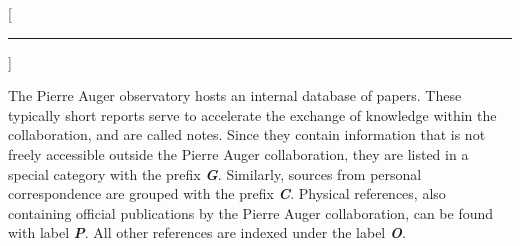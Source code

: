
[\hrule\vspace{-0.5cm}]
\printbibheading

The Pierre Auger observatory hosts an internal database of papers. These 
typically short reports serve to accelerate the exchange of knowledge within the
collaboration, and are called \GAP notes. Since they contain information that is
not freely accessible outside the Pierre Auger collaboration, they are listed in
a special category with the prefix \textbf{\textit{G}}. Similarly, sources from 
personal correspondence are grouped with the prefix \textbf{\textit{C}}. 
Physical references, also containing official publications by the Pierre Auger 
collaboration, can be found with label \textbf{\textit{P}}. All other 
references are indexed under the label \textbf{\textit{O}}.

\newrefcontext[labelprefix=G]
\printbibliography[keyword={auger},title={GAP Notes},heading=subbibliography]

\newrefcontext[labelprefix=C]
\printbibliography[keyword={private},title={Personal Correspondence},heading=subbibliography]

\newrefcontext[labelprefix=P]
\printbibliography[keyword={phys},notkeyword={GAP-Note},title={Physics References},heading=subbibliography]

\newrefcontext[labelprefix=O]
\printbibliography[notkeyword={private},notkeyword={phys},notkeyword={GAP-Note},title={Other References},heading=subbibliography]

\cleardoublepage
